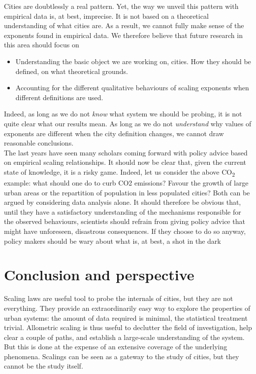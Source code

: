 Cities are doubtlessly a real pattern. Yet, the way we unveil this pattern with
empirical data is, at best, imprecise. It is not based on a theoretical
understanding of what cities are. As a result, we cannot fully make sense of the
exponents found in empirical data. We therefore believe that future research in
this area should focus on

\begin{itemize}
    \item Understanding the basic object we are working on, cities. How they 
        should be defined, on what theoretical grounds.
    \item Accounting for the different qualitative behaviours of scaling
        exponents when different definitions are used.
\end{itemize}

Indeed, as long as we do not \emph{know} what system we should be probing, it is
not quite clear what our results mean. As long as we do not \emph{understand}
why values of exponents are different when the city definition changes, we
cannot draw reasonable conclusions.\\

The last years have seen many scholars coming forward with policy advice based
on empirical scaling relationships. It should now be clear that, given the
current state of knowledge, it is a risky game. Indeed, let us consider the
above CO\textsubscript{2} example: what should one do to curb CO2 emissions?
Favour the growth of large urban areas or the repartition of population in less
populated cities?  Both can be argued by considering data analysis alone. It
should therefore be obvious that, until they have a satisfactory understanding
of the mechanisms responsible for the observed behaviours, scientists should
refrain from giving policy advice that might have unforeseen, disastrous
consequences. If they choose to do so anyway, policy makers should be wary about
what is, at best, a shot in the dark


\section{Conclusion and perspective}
\label{sec:conclusion_and_perspective}

Scaling laws are useful tool to probe the internals of cities, but they are not
everything. They provide an extraordinarily easy way to explore the properties
of urban systems: the amount of data required is minimal, the statistical treatment
trivial. Allometric scaling is thus useful to declutter the field of investigation, help clear
a couple of paths, and establish a large-scale understanding of the system. But
this is done at the expense of an extensive coverage of the underlying
phenomena. Scalings can be seen as a gateway to the study of cities, but they
cannot be the study itself.

